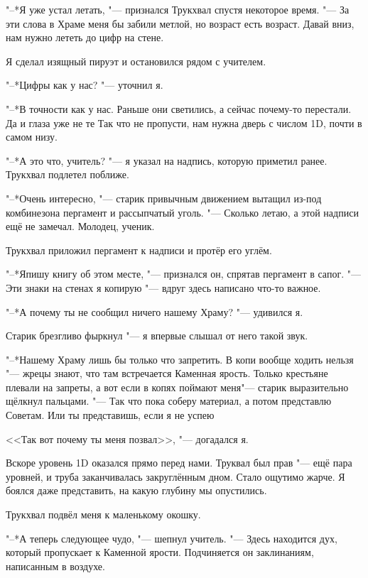 \razd

"--*Я уже устал летать, "--- признался Трукхвал спустя некоторое время.
"--- За эти слова в Храме меня бы забили метлой, но возраст есть возраст.
Давай вниз, нам нужно лететь до цифр на стене.

Я сделал изящный пируэт и остановился рядом с учителем.

"--*Цифры как у нас? "--- уточнил я.

"--*В точности как у нас.
Раньше они светились, а сейчас почему-то перестали.
Да и глаза уже не те\ldotst
Так что не пропусти, нам нужна дверь с числом 1D, почти в самом низу.

"--*А это что, учитель? "--- я указал на надпись, которую приметил ранее.
Трукхвал подлетел поближе.

"--*Очень интересно, "--- старик привычным движением вытащил из-под комбинезона пергамент и рассыпчатый уголь.
"--- Сколько летаю, а этой надписи ещё не замечал.
Молодец, ученик.

Трукхвал приложил пергамент к надписи и протёр его углём.

"--*Я\ldotst пишу книгу об этом месте, "--- признался он, спрятав пергамент в сапог.
"--- Эти знаки на стенах я копирую "--- вдруг здесь написано что-то важное.

"--*А почему ты не сообщил ничего нашему Храму? "--- удивился я.

Старик брезгливо фыркнул "--- я впервые слышал от него такой звук.

"--*Нашему Храму лишь бы только что запретить.
В копи вообще ходить нельзя "--- жрецы знают, что там встречается Каменная ярость.
Только крестьяне плевали на запреты, а вот если в копях поймают меня\ldotst "--- старик выразительно щёлкнул пальцами.
"--- Так что пока соберу материал, а потом представлю Советам.
Или ты представишь, если я не успею\ldotst

<<Так вот почему ты меня позвал>>, "--- догадался я.

\razd

Вскоре уровень 1D оказался прямо перед нами.
Труквал был прав "--- ещё пара уровней, и труба заканчивалась закруглённым дном.
Стало ощутимо жарче.
Я боялся даже представить, на какую глубину мы опустились.

Трукхвал подвёл меня к маленькому окошку.

"--*А теперь следующее чудо, "--- шепнул учитель.
"--- Здесь находится дух, который пропускает к Каменной ярости.
Подчиняется он заклинаниям, написанным в воздухе.

